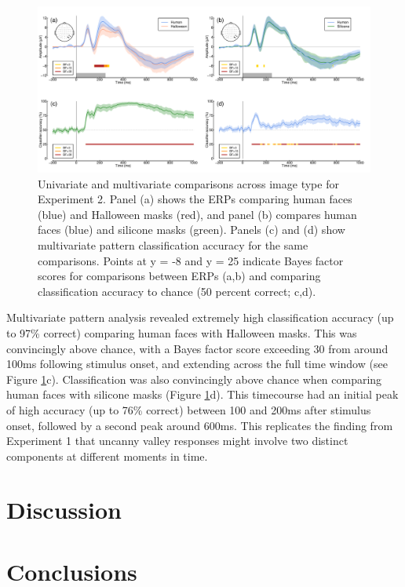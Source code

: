 \documentclass[
]{article}
\begin{document}
\begin{figure}

{\centering \includegraphics{Figures/MaskSMVPA} 

}

\caption{Univariate and multivariate comparisons across image type for Experiment 2. Panel (a) shows the ERPs comparing human faces (blue) and Halloween masks (red), and panel (b) compares human faces (blue) and silicone masks (green). Panels (c) and (d) show multivariate pattern classification accuracy for the same comparisons. Points at y = -8 and y = 25 indicate Bayes factor scores for comparisons between ERPs (a,b) and comparing classification accuracy to chance (50 percent correct; c,d).}\label{fig:MasksMVPA}
\end{figure}

Multivariate pattern analysis revealed extremely high classification accuracy (up to 97\% correct) comparing human faces with Halloween masks. This was convincingly above chance, with a Bayes factor score exceeding 30 from around 100ms following stimulus onset, and extending across the full time window (see Figure \ref{fig:MasksMVPA}c). Classification was also convincingly above chance when comparing human faces with silicone masks (Figure \ref{fig:MasksMVPA}d). This timecourse had an initial peak of high accuracy (up to 76\% correct) between 100 and 200ms after stimulus onset, followed by a second peak around 600ms. This replicates the finding from Experiment 1 that uncanny valley responses might involve two distinct components at different moments in time.

\hypertarget{discussion}{%
\section{Discussion}\label{discussion}}

\hypertarget{conclusions}{%
\section{Conclusions}\label{conclusions}}
\end{document}
